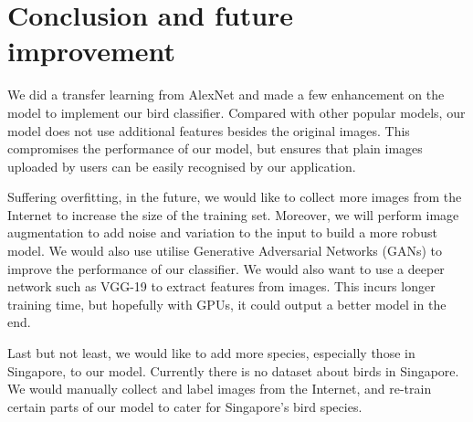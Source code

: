 \documentclass[letterpaper, 12pt]{article}
\begin{document}
\section{Conclusion and future improvement}
We did a transfer learning from AlexNet and made a few enhancement on the model to implement our bird classifier. Compared with other popular models, our model
does not use additional features besides the original images. This compromises the performance of our model, but ensures that plain images uploaded by users
can be easily recognised by our application.

Suffering overfitting, in the future, we would like to collect more images from the Internet to increase the size of the training set. Moreover, we will
perform image augmentation to add noise and variation to the input to build a more robust model. We would also use utilise Generative Adversarial Networks (GANs)
to improve the performance of our classifier. We would also want to use a deeper network such as VGG-19 to extract features from images. This incurs longer training time,
but hopefully with GPUs, it could output a better model in the end.

Last but not least, we would like to add more species, especially those in Singapore, to our model. Currently there is no dataset about birds in Singapore. We
would manually collect and label images from the Internet, and re-train certain parts of our model to cater for Singapore's bird species.



\end{document}
